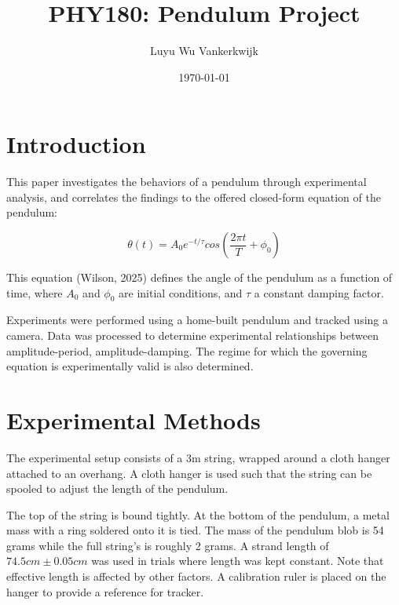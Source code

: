 \documentclass[prl,twocolumn,amsmath,amssymb,superscriptaddress]{revtex4-2}
\begin{document}
\title{PHY180: Pendulum Project}
\author{Luyu Wu Vankerkwijk}
\date{\today}


\maketitle

\section{Introduction}
This paper investigates the behaviors of a pendulum through experimental analysis, and correlates the findings to the offered closed-form equation of the pendulum:

\begin{equation}
    \theta(t) = A_0e^{-t/\tau}cos\left(\frac{2\pi t}{T}+\phi_0\right)
    \label{eq:given}
\end{equation}

This equation (Wilson, 2025) defines the angle of the pendulum as a function of time, where $A_0$ and $\phi_0$ are initial conditions, and $\tau$ a constant damping factor.

Experiments were performed using a home-built pendulum and tracked using a camera. Data was processed to determine experimental relationships between amplitude-period, amplitude-damping. The regime for which the governing equation is experimentally valid is also determined.

\section{Experimental Methods}
The experimental setup consists of a 3m string, wrapped around a cloth hanger attached to an overhang. A cloth hanger is used such that the string can be spooled to adjust the length of the pendulum.

The top of the string is bound tightly. At the bottom of the pendulum, a metal mass with a ring soldered onto it is tied. The mass of the pendulum blob is 54 grams while the full string's is roughly 2 grams. A strand length of $74.5 cm \pm 0.05 cm$ was used in trials where length was kept constant. Note that effective length is affected by other factors. A calibration ruler is placed on the hanger to provide a reference for tracker.
\end{document}
